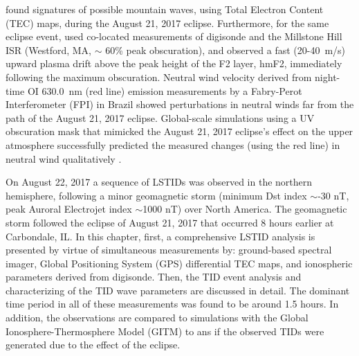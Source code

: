 \documentclass[crop=false,class=mitthesis,oneside,font=12pt]{standalone}
\begin{document}
\citet{coster_gnss_2017} found signatures of possible mountain waves, using Total Electron Content (TEC) maps, during the August 21, 2017 eclipse. Furthermore, for the same eclipse event, \citet{goncharenko_mh_hill_eclipse} used co-located measurements of digisonde and the Millstone Hill ISR (Westford, MA, $\sim$ 60\% peak obscuration), and observed a fast (20-40~m/s) upward plasma drift above the peak height of the F2 layer, hmF2, immediately following the maximum obscuration. Neutral wind velocity derived from night-time OI 630.0~nm (red line) emission measurements by a Fabry-Perot Interferometer (FPI) in Brazil showed perturbations in neutral winds far from the path of the August 21, 2017 eclipse. Global-scale simulations using a UV obscuration mask that mimicked the August 21, 2017 eclipse's effect on the upper atmosphere successfully predicted the measured changes (using the red line) in neutral wind qualitatively \citep{harding_nightside_eclipse}.


On August 22, 2017 a sequence of LSTIDs was observed in the northern hemisphere, following a minor geomagnetic storm (minimum Dst index $\sim$-30 nT, peak Auroral Electrojet index $\sim$1000 nT) over North America. The geomagnetic storm followed the eclipse of August 21, 2017 that occurred 8 hours earlier at Carbondale, IL. In this chapter, first, a comprehensive LSTID analysis is presented by virtue of simultaneous measurements by: ground-based spectral imager, Global Positioning System (GPS) differential TEC maps, and ionospheric parameters derived from digisonde. Then, the TID event analysis and characterizing of the TID wave parameters are discussed in detail. The dominant time period in all of these measurements was found to be around 1.5 hours. In addition, the observations are compared to simulations with the Global Ionosphere-Thermosphere Model (GITM) \citep{ridley_global_2006} to ans if the observed TIDs were generated due to the effect of the eclipse.
\end{document}

